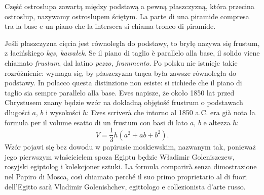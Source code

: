 \begin{definition}
[ostrosłup ścięty]%
[tronco di piramide]%
    Część ostrosłupa zawartą między podstawą a pewną płaszczyzną, która przecina ostrosłup, nazywamy ostrosłupem ściętym. %
    La parte di una piramide compresa tra la base e un piano che la interseca si chiama tronco di piramide. %
\end{definition}

Jeśli płaszczyzna cięcia jest równoległa do podstawy, to bryłę nazywa się frustum, z łacińskiego \emph{kęs, kawałek}. %
Se il piano di taglio è parallelo alla base, il solido viene chiamato \emph{frustum}, dal latino \emph{pezzo, frammento}. %
%
Po polsku nie istnieje takie rozróżnienie: wymaga się, by płaszczyzna tnąca była zawsze równoległa do podstawy. %
In polacco questa distinzione non esiste: si richiede che il piano di taglio sia sempre parallelo alla base. %
Eves \cite[s.4]{eves1_1972} napisze, że około 1850 lat przed Chrystusem znany będzie wzór na dokładną objętość frustrum o podstawach długości $a$, $b$ i wysokości $h$: %
Eves \cite[p. 4]{eves1_1972} scriverà che intorno al 1850 a.C. era già nota la formula per il volume esatto di un frustum con basi di lato $a$, $b$ e altezza $h$: %
\begin{equation}
	V = \frac 1 3 h (a^2 + ab + b^2).
\end{equation}
Wzór pojawi się bez dowodu w papirusie moskiewskim, nazwanym tak, ponieważ jego pierwszym właścicielem spoza Egiptu będzie Władimir Goleniszczew, rosyjski egiptolog i kolekcjoner sztuki. %
La formula comparirà senza dimostrazione nel Papiro di Mosca, così chiamato perché il suo primo proprietario al di fuori dell'Egitto sarà Vladimir Golenishchev, egittologo e collezionista d'arte russo. %

%
